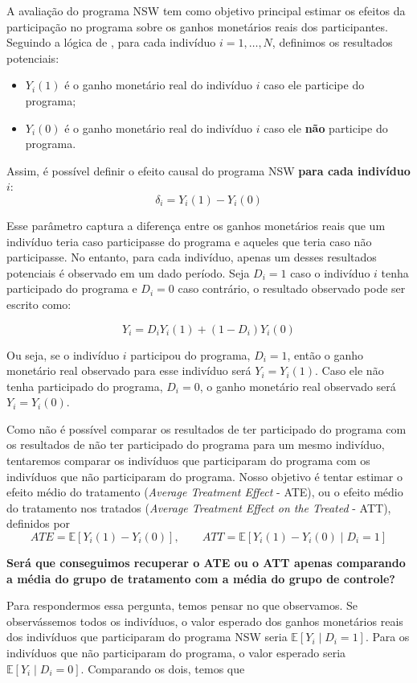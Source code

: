 A avaliação do programa NSW tem como objetivo principal estimar os efeitos da participação no programa sobre os ganhos monetários reais dos participantes. Seguindo a lógica de \cite{ImbensRubin2015}, para cada indivíduo $i = 1,\dots,N$, definimos os resultados potenciais:

\begin{itemize}
    \item $Y_i(1)$ é o ganho monetário real do indivíduo $i$ caso ele participe do programa;
    \item $Y_i(0)$ é o ganho monetário real do indivíduo $i$ caso ele \textbf{não} participe do programa.
\end{itemize}

Assim, é possível definir o efeito causal do programa NSW \textbf{para cada indivíduo $i$}:
$$ \delta_i = Y_i(1) - Y_i(0)$$

Esse parâmetro captura a diferença entre os ganhos monetários reais que um indivíduo teria caso participasse do programa e aqueles que teria caso não participasse. No entanto, para cada indivíduo, apenas um desses resultados potenciais é observado em um dado período. Seja $D_i = 1$ caso o indivíduo $i$ tenha participado do programa e $D_i = 0$ caso contrário, o resultado observado pode ser escrito como:

$$
Y_i = D_i Y_i(1) + (1 - D_i) Y_i(0)
$$

Ou seja, se o indivíduo $i$ participou do programa, $D_i = 1$, então o ganho monetário real observado para esse indivíduo será $Y_i = Y_i(1)$. Caso ele não tenha participado do programa, $D_i = 0$, o ganho monetário real observado será $Y_i = Y_i(0)$.

Como não é possível comparar os resultados de ter participado do programa com os resultados de não ter participado do programa para um mesmo indivíduo, tentaremos comparar os indivíduos que participaram do programa com os indivíduos que não participaram do programa. Nosso objetivo é tentar estimar o efeito médio do tratamento (\textit{Average Treatment Effect} - ATE), ou o efeito médio do tratamento nos tratados (\textit{Average Treatment Effect on the Treated} - ATT), definidos por
$$
ATE = \mathbb{E}[Y_i(1) - Y_i(0)], \qquad ATT = \mathbb{E}[Y_i(1) - Y_i(0) \mid D_i = 1]
$$

\textbf{Será que conseguimos recuperar o ATE ou o ATT apenas comparando a média do grupo de tratamento com a média do grupo de controle?} 

Para respondermos essa pergunta, temos pensar no que observamos. Se observássemos todos os indivíduos, o valor esperado dos ganhos monetários reais dos indivíduos que participaram do programa NSW seria $\mathbb{E}[Y_i \mid D_i = 1]$. Para os indivíduos que não participaram do programa, o valor esperado seria $\mathbb{E}[Y_i \mid D_i = 0]$. Comparando os dois, temos que

